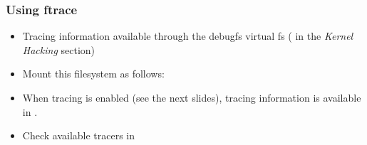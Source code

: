 \begin{frame}
  \frametitle{Using ftrace}
  \begin{itemize}
  \item Tracing information available through the debugfs virtual fs
    ( in the {\em Kernel Hacking} section)
  \item Mount this filesystem as follows:\\
  \item When tracing is enabled (see the next slides), tracing
    information is available in .
  \item Check available tracers in
  \end{itemize}
\end{frame}

